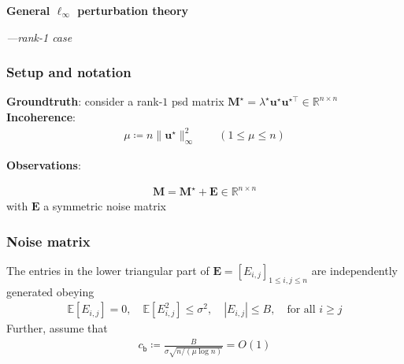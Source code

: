 \documentclass[compress,
mathserif,wide,%
]{beamer}
\begin{document}
\begin{frame}[plain]
\vfill
\centering
{\large \bf General $\ell_{\infty}$ perturbation theory}

{\hfill \em ---rank-1 case}
\vfill
\end{frame}

%
\begin{frame}
	\frametitle{Setup and notation}
	{\bf Groundtruth}: consider a rank-$1$ psd matrix $\bm{M}^{\star} = \lambda^{\star} \bm{u}^{\star} \bm{u}^{\star\top}\in \mathbb{R}^{n\times n}$   \\
	
	\vspace{1em}
	{\bf Incoherence}: 
	\begin{align*}
	\mu \coloneqq {n\|\bm{u}^{\star}\|_{\infty}^{2}} \qquad (1 \leq \mu \leq n)
\end{align*}

	\vspace{1em}
	{\bf Observations}: 
	
	\begin{align*}
	\bm{M}=\bm{M}^{\star}+\bm{E} \in \mathbb{R}^{n\times n}
\end{align*}
with $\bm{E}$ a symmetric noise matrix
\end{frame}


\begin{frame}
	\frametitle{Noise matrix}


	The entries in the lower triangular part of $\bm{E}=[E_{i,j}]_{1\leq i,j\leq n}$ are independently generated obeying
%
\begin{align*}
	\mathbb{E}[E_{i,j}] = 0, \quad \mathbb{E}[E_{i,j}^2]\leq \sigma^2, \quad |E_{i,j}|\leq B, \quad \text{for all }i\geq j
\end{align*}
%
	Further,  assume that 
	\begin{align*}
		c_{\mathsf{b}} \coloneqq \frac{B}{  \sigma  \sqrt{n/(\mu\log n)} } = O(1)
	\end{align*}
	
\end{frame}
\end{document}
